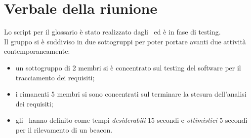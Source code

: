\documentclass[../Riunione16-01-13.tex]{subfiles}
\begin{document}
\section{Verbale della riunione}
Lo script per il glossario è stato realizzato dagli \amministratori\ ed è in fase di testing. \\
Il gruppo si è suddiviso in due sottogruppi per poter portare avanti due attività contemporaneamente:
\begin{itemize}
	\item un sottogruppo di 2 membri si è concentrato sul testing del software per il tracciamento dei requisiti;
	\item i rimanenti 5 membri si sono concentrati sul terminare la stesura dell'analisi dei requisiti;
	\item gli \analisti\ hanno definito come tempi \textit{desiderabili} 15 secondi e \textit{ottimistici} 5 secondi per il rilevamento di un beacon.
\end{itemize}
\end{document}

